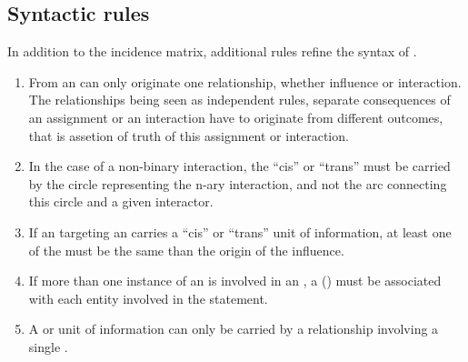 
\subsection{Syntactic rules}
\label{sec:SyntacticRules}

In addition to the incidence matrix, additional rules refine the syntax of \ERs.


\begin{enumerate}
\item From an  can only originate one relationship, whether influence or interaction. The relationships being seen as independent rules, separate consequences of an assignment or an interaction have to originate from different outcomes, that is assetion of truth of this assignment or interaction.
\item In the case of a non-binary interaction, the ``cis'' or ``trans''  must be carried by the circle representing the n-ary interaction, and not the arc connecting this circle and a given interactor.
\item If an  targeting an  carries a ``cis'' or ``trans'' unit of information, at least one of the  must be the same  than the origin of the influence. 
\item If more than one instance of an  is involved in an , a   () must be associated with each entity involved in the statement.
\item A  or  unit of information can only be carried by a relationship involving a single .
\end{enumerate}  

